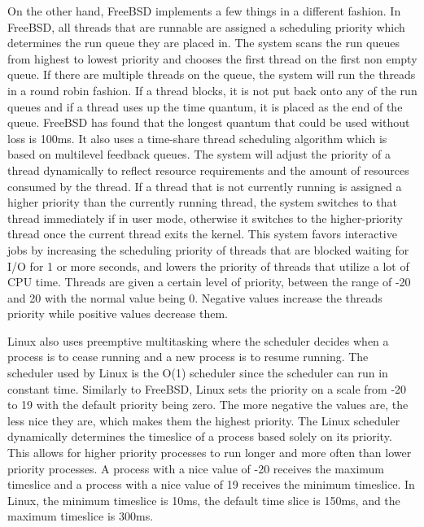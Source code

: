 \documentclass[letterpaper,10pt,draftclsnofoot,onecolumn,titlepage]{IEEEtran}
\begin{document}
		On the other hand, FreeBSD implements a few things in a different fashion. In FreeBSD, all threads that are runnable are assigned a scheduling priority which determines the run queue they are placed in. The system scans the run queues from highest to lowest priority and chooses the first thread on the first non empty queue. If there are multiple threads on the queue, the system will run the threads in a round robin fashion. If a thread blocks, it is not put back onto any of the run queues and if a thread uses up the time quantum, it is placed as the end of the queue. \cite[FreeBSD Process Management]{FreeBSD} FreeBSD has found that the longest quantum that could be used without loss is 100ms. It also uses a time-share thread scheduling algorithm which is based on multilevel feedback queues. The system will adjust the priority of a thread dynamically to reflect resource requirements and the amount of resources consumed by the thread. If a thread that is not currently running is assigned a higher priority than the currently running thread, the system switches to that thread immediately if in user mode, otherwise it switches to the higher-priority thread once the current thread exits the kernel. This system favors interactive jobs by increasing the scheduling priority of threads that are blocked waiting for I/O for 1 or more seconds, and lowers the priority of threads that utilize a lot of CPU time. Threads are given a certain level of priority, between the range of {-20} and 20 with the normal value being 0. Negative values increase the threads priority while positive values decrease them.
		\par
		Linux also uses preemptive multitasking where the scheduler decides when a process is to cease running and a new process is to resume running. The scheduler used by Linux is the O(1) scheduler since the scheduler can run in constant time. Similarly to FreeBSD, Linux sets the priority on a scale from -20 to 19 with the default priority being zero. The more negative the values are, the less nice they are, which makes them the highest priority. The Linux scheduler dynamically determines the timeslice of a process based solely on its priority. This allows for higher priority processes to run longer and more often than lower priority processes. \cite[The Linux Process Scheduler]{LinuxKernelDev} A process with a nice value of {-20} receives the maximum timeslice and a process with a nice value of 19 receives the minimum timeslice. In Linux, the minimum timeslice is 10ms, the default time slice is 150ms, and the maximum timeslice is 300ms.
\end{document}
